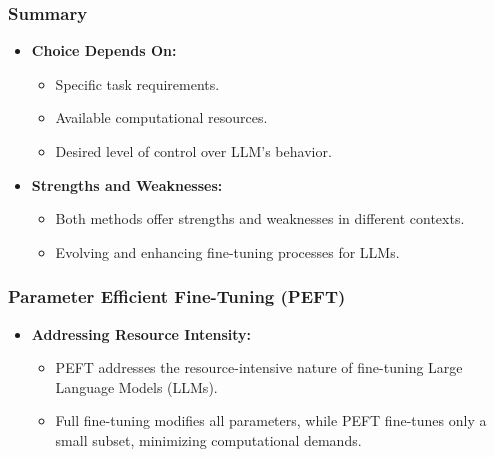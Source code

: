\begin{frame}[fragile]\frametitle{Summary}
  \begin{itemize}
    \item \textbf{Choice Depends On:}
      \begin{itemize}
        \item Specific task requirements.
        \item Available computational resources.
        \item Desired level of control over LLM's behavior.
      \end{itemize}
    \item \textbf{Strengths and Weaknesses:}
      \begin{itemize}
        \item Both methods offer strengths and weaknesses in different contexts.
        \item Evolving and enhancing fine-tuning processes for LLMs.
      \end{itemize}
  \end{itemize}
\end{frame}

\begin{frame}[fragile]\frametitle{Parameter Efficient Fine-Tuning (PEFT)}
  \begin{itemize}
    \item \textbf{Addressing Resource Intensity:}
      \begin{itemize}
        \item PEFT addresses the resource-intensive nature of fine-tuning Large Language Models (LLMs).
        \item Full fine-tuning modifies all parameters, while PEFT fine-tunes only a small subset, minimizing computational demands.
      \end{itemize}
  \end{itemize}
\end{frame}

